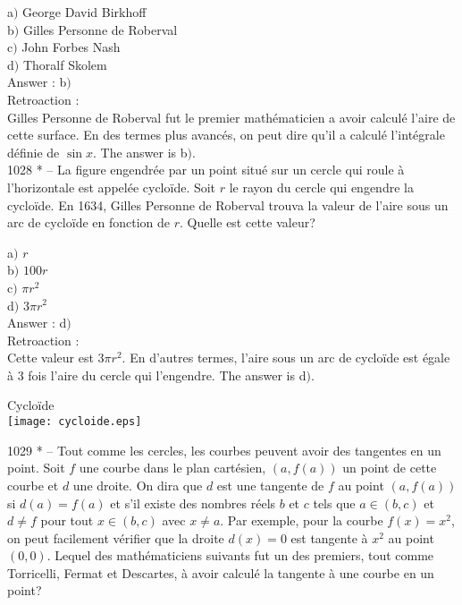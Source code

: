 ﻿\documentclass[letterpaper, 12pt]{article}
\begin{document}
a$)$ George David Birkhoff  \\
b$)$ Gilles Personne de Roberval \\
c$)$ John Forbes Nash  \\
d$)$ Thoralf Skolem\\

Answer : b$)$\\

Retroaction :\\
Gilles Personne de Roberval fut le premier math\'ematicien a avoir
calcul\'e l'aire de cette surface. En des termes plus avanc\'es, on
peut dire qu'il a calcul\'e l'int\'egrale d\'efinie de $\sin x$.
The answer is b$)$.\\

1028 * -- La figure engendr\'ee par un point situ\'e sur un cercle
qui roule \`a l'horizontale est appel\'ee cyclo\"ide. Soit $r$ le
rayon du cercle qui engendre la cyclo\"ide. En 1634, Gilles Personne
de Roberval trouva la valeur de l'aire sous un arc de cyclo\"ide en
fonction de $r$. Quelle est cette valeur?

a$)$ $r$  \\
b$)$ $100r$ \\
c$)$ $\pi r^2$  \\
d$)$ $3\pi r^2$ \\

Answer : d$)$\\

Retroaction :\\
Cette valeur est $3\pi r^2$. En d'autres termes, l'aire sous un arc
de cyclo\"ide est \'egale \`a 3 fois l'aire du cercle qui
l'engendre.
The answer is d$)$.\\

        \begin{center}
Cyclo\"ide        \\
    \texttt{[image: cycloide.eps]}\\
    \end{center}

1029 * -- Tout comme les cercles, les courbes peuvent avoir des
tangentes en un point. Soit $f$ une courbe dans le plan cart\'esien,
$(a,f(a))$ un point de cette courbe et $d$ une droite. On dira que
$d$ est une tangente de $f$ au point $(a,f(a))$ si $d(a)=f(a)$ et
s'il existe des nombres r\'eels $b$ et $c$ tels que $a\in(b,c)$ et
$d\not=f$ pour tout $x\in(b,c)$ avec $x\not=a$. Par exemple, pour la
courbe $f(x)=x^2$, on peut facilement v\'erifier que la droite
$d(x)=0$ est tangente \`a $x^2$ au point $(0,0)$. Lequel des
math\'ematiciens suivants fut un des premiers, tout comme
Torricelli, Fermat et Descartes, \`a avoir calcul\'e la tangente \`a
une courbe en un point?
\end{document}
